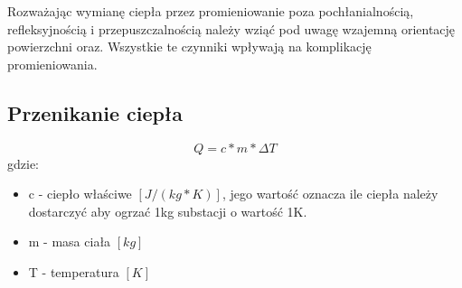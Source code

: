 Rozważając wymianę ciepła przez promieniowanie poza pochłanialnością, refleksyjnością i przepuszczalnością należy wziąć pod uwagę
wzajemną orientację powierzchni oraz. Wszystkie te czynniki wpływają na komplikację promieniowania.

\subsection {Przenikanie ciepła}
\begin {equation}
Q=c*m*\Delta T
\label {ilosc_ciepla}
\end {equation}
gdzie:
\begin {itemize}
\item c - ciepło właściwe $[J/ (kg * K)]$, jego wartość oznacza ile ciepła należy dostarczyć aby ogrzać 1kg substacji o wartość
1K.
\item m - masa ciała $[kg]$
\item T - temperatura  $[K]$
\end {itemize}
